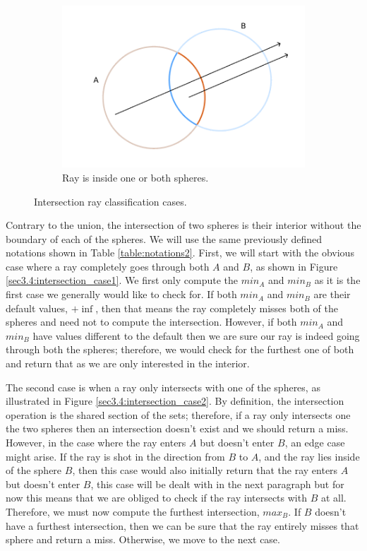 \documentclass[a4paper,11pt,oneside]{article}
\begin{document}
\begin{figure}[ht]
\begin{subfigure}[b]{0.3\textwidth}
         \includegraphics[width=\textwidth]{section3/3.4/sphere_intersection_case3.png}
         \caption{Ray is inside one or both spheres.}
         \label{sec3.4:intersection_case3}
     \end{subfigure}
        \caption{Intersection ray classification cases.}
        \label{sec3.4:sphere_intersection}
\end{figure}

Contrary to the union, the intersection of two spheres is their interior without the boundary of each of the spheres. We will use the same previously defined notations shown in Table \ref{table:notations2}. First, we will start with the obvious case where a ray completely goes through both $A$ and $B$, as shown in Figure \ref{sec3.4:intersection_case1}. We first only compute the $min_A$ and $min_B$ as it is the first case we generally would like to check for. If both $min_A$ and $min_B$ are their default values, $+\inf$, then that means the ray completely misses both of the spheres and need not to compute the intersection. However, if both $min_A$ and $min_B$ have values different to the default then we are sure our ray is indeed going through both the spheres; therefore, we would check for the furthest one of both and return that as we are only interested in the interior.

The second case is when a ray only intersects with one of the spheres, as illustrated in Figure \ref{sec3.4:intersection_case2}. By definition, the intersection operation is the shared section of the sets; therefore, if a ray only intersects one the two spheres then an intersection doesn't exist and we should return a miss. However, in the case where the ray enters $A$ but doesn't enter $B$, an edge case might arise. If the ray is shot in the direction from $B$ to $A$, and the ray lies inside of the sphere $B$, then this case would also initially return that the ray enters $A$ but doesn't enter $B$, this case will be dealt with in the next paragraph but for now this means that we are obliged to check if the ray intersects with $B$ at all. Therefore, we must now compute the furthest intersection, $max_B$. If $B$ doesn't have a furthest intersection, then we can be sure that the ray entirely misses that sphere and return a miss. Otherwise, we move to the next case.
\end{document}

